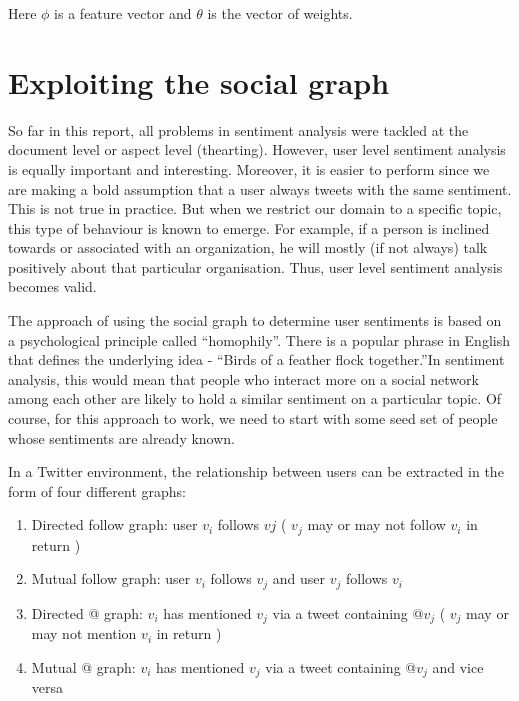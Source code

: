 Here $\phi$ is a feature vector and $\theta$ is the vector of weights.
\section{Exploiting the social graph}

So far in this report, all problems in sentiment analysis were tackled at the document level or aspect level (thearting). However, user level sentiment analysis is equally 
important and interesting. Moreover, it is easier to perform since we are making a bold assumption that a user always tweets with the same sentiment. This is not true in practice.
But when we restrict our domain to a specific topic, this type of behaviour is known to emerge. For example, if a person is inclined towards or associated with an organization,
he will mostly (if not always) talk positively about that particular organisation. Thus, user level sentiment analysis becomes valid.

\vspace{8mm}

The approach of using the social graph to determine user sentiments is based on a psychological principle called \textquotedblleft homophily\textquotedblright. There is a 
popular phrase in English that defines the underlying idea - \textquotedblleft Birds of a feather flock together.\textquotedblright  In sentiment analysis, this would mean
that people who interact more on a social network among each other are likely to hold a similar sentiment on a particular topic. Of course, for this approach to work, we need
to start with some seed set of people whose sentiments are already known. \cite{user}

\vspace{8mm}

In a Twitter environment, the relationship between users can be extracted in the form of four different graphs:

\begin{enumerate}
\setlength{\itemsep}{15pt}
\item Directed follow graph: user $v_i$ follows $vj$ ( $v_j$ may or may not follow $v_i$ in return )
\item Mutual follow graph: user $v_i$ follows $v_j$ and user $v_j$ follows $v_i$
\item Directed @ graph: $v_i$ has mentioned $v_j$ via a tweet containing @$v_j$ ( $v_j$ may or may not mention $v_i$ in return )
\item Mutual @ graph: $v_i$ has mentioned $v_j$ via a tweet containing @$v_j$ and vice versa

\end{enumerate}

